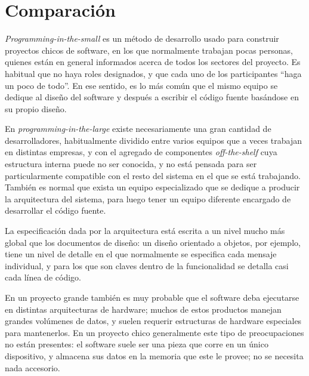 
\section{Comparación}


\textit{Programming-in-the-small} es un método de desarrollo usado para construir proyectos chicos de software, en los que normalmente trabajan pocas personas, quienes están en general informados acerca de todos los sectores del proyecto. Es habitual que no haya roles designados, y que cada uno de los participantes ``haga un poco de todo''. En ese sentido, es lo más común que el mismo equipo se dedique al diseño del software y después a escribir el código fuente basándose en su propio diseño.

En \textit{programming-in-the-large} existe necesariamente una gran cantidad de desarrolladores, habitualmente dividido entre varios equipos que a veces trabajan en distintas empresas, y con el agregado de componentes \textit{off-the-shelf} cuya estructura interna puede no ser conocida, y no está pensada para ser particularmente compatible con el resto del sistema  en el que se está trabajando. También es normal que exista un equipo especializado que se dedique a producir la arquitectura del sistema, para luego tener un equipo diferente encargado de desarrollar el código fuente. 

La especificación dada por la arquitectura está escrita a un nivel mucho más global que los documentos de diseño: un diseño orientado a objetos, por ejemplo, tiene un nivel de detalle en el que normalmente se especifica cada mensaje individual, y para los que son claves dentro de la funcionalidad se detalla casi cada línea de código.

En un proyecto grande también es muy probable que el software deba ejecutarse en distintas arquitecturas de hardware; muchos de estos productos manejan grandes volúmenes de datos, y suelen requerir estructuras de hardware especiales para mantenerlos. En un proyecto chico generalmente este tipo de preocupaciones no están presentes: el software suele ser una pieza que corre en un único dispositivo, y almacena sus datos en la memoria que este le provee; no se necesita nada accesorio.

